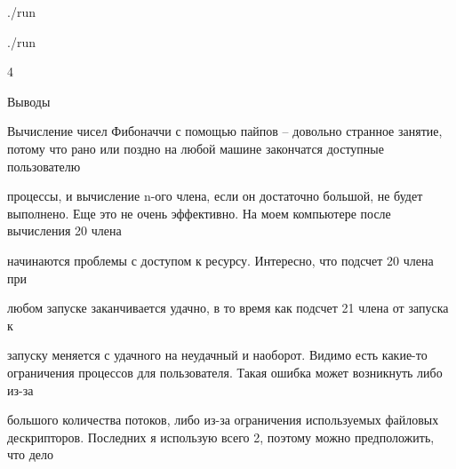 \documentclass[a4paper,portrait,12pt]{article}
\begin{document}
\begin{flushleft}
./run
\end{flushleft}





\begin{flushleft}
./run
\end{flushleft}





4










\begin{flushleft}
Выводы
\end{flushleft}





\begin{flushleft}
Вычисление чисел Фибоначчи с помощью пайпов -- довольно странное занятие, потому что рано или поздно на любой машине закончатся доступные пользователю
\end{flushleft}


\begin{flushleft}
процессы, и вычисление n-ого члена, если он достаточно большой, не будет выполнено. Еще это не очень эффективно. На моем компьютере после вычисления 20 члена
\end{flushleft}


\begin{flushleft}
начинаются проблемы с доступом к ресурсу. Интересно, что подсчет 20 члена при
\end{flushleft}


\begin{flushleft}
любом запуске заканчивается удачно, в то время как подсчет 21 члена от запуска к
\end{flushleft}


\begin{flushleft}
запуску меняется с удачного на неудачный и наоборот. Видимо есть какие-то ограничения процессов для пользователя. Такая ошибка может возникнуть либо из-за
\end{flushleft}


\begin{flushleft}
большого количества потоков, либо из-за ограничения используемых файловых дескрипторов. Последних я использую всего 2, поэтому можно предположить, что дело
\end{flushleft}
\end{document}
